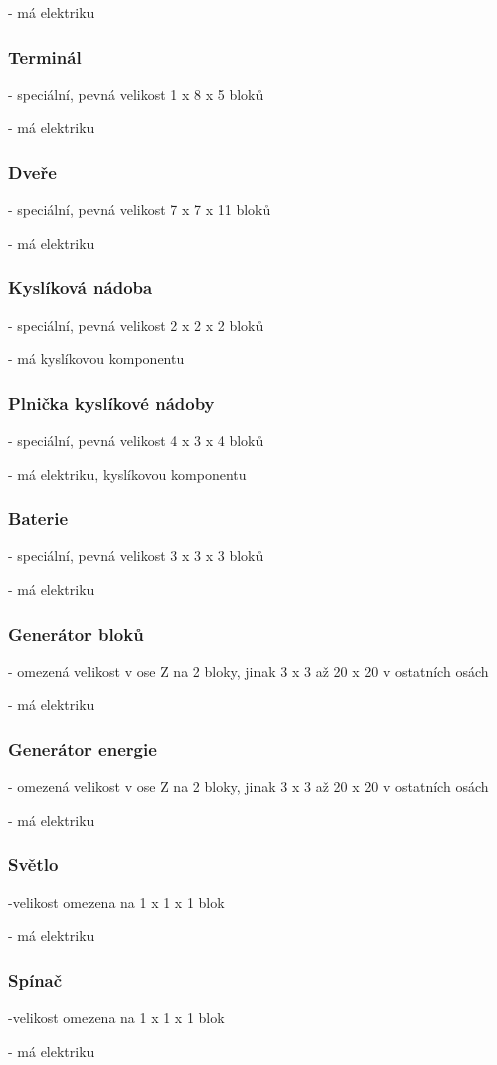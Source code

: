 - má elektriku


\subsubsection{Terminál}
- speciální, pevná velikost 1 x 8 x 5 bloků

- má elektriku

\subsubsection{Dveře}
- speciální, pevná velikost 7 x 7 x 11 bloků

- má elektriku

\subsubsection{Kyslíková nádoba}
- speciální, pevná velikost 2 x 2 x 2 bloků

- má kyslíkovou komponentu

\subsubsection{Plnička kyslíkové nádoby}
- speciální, pevná velikost 4 x 3 x 4 bloků

- má elektriku, kyslíkovou komponentu


\subsubsection{Baterie}
- speciální, pevná velikost 3 x 3 x 3 bloků

- má elektriku

\subsubsection{Generátor bloků}

- omezená velikost v ose Z na 2 bloky, jinak 3 x 3 až 20 x 20 v ostatních osách

- má elektriku

\subsubsection{Generátor energie}

- omezená velikost v ose Z na 2 bloky, jinak 3 x 3 až 20 x 20 v ostatních osách

- má elektriku

\subsubsection{Světlo}

-velikost omezena na 1 x 1 x 1 blok

- má elektriku

\subsubsection{Spínač}


-velikost omezena na 1 x 1 x 1 blok

- má elektriku